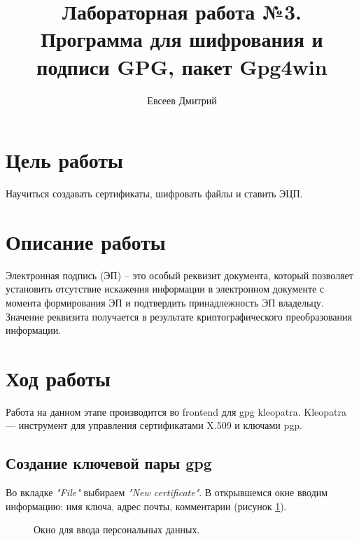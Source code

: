 \documentclass[10pt,a4paper]{report}
\author{Евсеев Дмитрий}
\title{Лабораторная работа №3.\\
	Программа для шифрования и подписи GPG, пакет Gpg4win}
\begin{document}
	\maketitle
	\tableofcontents
	\pagebreak
	
	\section{Цель работы}
	Научиться создавать сертификаты, шифровать файлы и ставить ЭЦП.
	
	\section{Описание работы}
	Электронная подпись (ЭП) – это особый реквизит документа, который позволяет установить отсутствие искажения информации в электронном документе с момента формирования ЭП и подтвердить принадлежность ЭП владельцу. Значение реквизита получается в результате криптографического преобразования информации.
	
	\section{Ход работы}
	Работа на данном этапе производится во frontend для gpg kleopatra. Kleopatra — инструмент для управления сертификатами X.509 и ключами pgp.
	
	\subsection{Создание ключевой пары gpg}
	Во вкладке \textit{"File"} выбираем \textit{"New certificate"}. В открывшемся окне вводим информацию: имя ключа, адрес почты, комментарии (рисунок \ref{Img:1}).
	
		\begin{figure}[h]	
			\caption{Окно для ввода персональных данных.}
			\label{Img:1}
		\end{figure}
	
\end{document}
